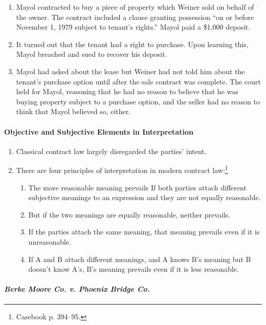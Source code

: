 \begin{enumerate}
    \item Mayol contracted to buy a piece of property which Weiner sold on 
    behalf of the owner. The contract included a clause granting possession 
    ``on or before November 1, 1979 subject to tenant's rights.'' Mayol paid a 
    \$1,000 deposit.
    \item It turned out that the tenant had a right to purchase. Upon learning 
    this, Mayol breached and sued to recover his deposit.
    \item Mayol had asked about the lease but Weiner had not told him about 
    the tenant's purchase option until after the sale contract was complete. 
    The court held for Mayol, reasoning that he had no reason to believe that 
    he was buying property subject to a purchase option, and the seller had no 
    reason to think that Mayol believed so, either.
\end{enumerate}

\paragraph{Objective and Subjective Elements in Interpretation}

\begin{enumerate}
    \item Classical contract law largely disregarded the parties' intent.
    \item There are four principles of interpretation in modern contract 
    law:\footnote{Casebook p. 394--95.}
    \begin{enumerate}
        \item The more reasonable meaning prevails If both parties attach 
        different subjective meanings to an expression  and they 
        are not equally reasonable.
        \item But if the two meanings are equally reasonable, neither 
        prevails.
        \item If the parties attach the same meaning, that meaning prevails 
        even if it is unreasonable.
        \item If A and B attach different meanings, and A knows B's meaning 
        but B doesn't know A's, B's meaning prevails even if it is less 
        reasonable.
    \end{enumerate}
\end{enumerate}

\paragraph{\emph{Berke Moore Co. v. Phoenix Bridge Co.}}

